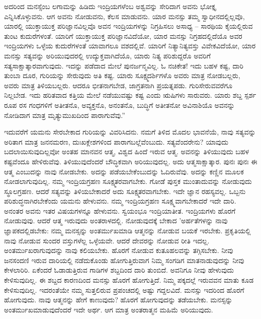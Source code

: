 ಅದರಿಂದ ಮನಸ್ಸೆಂಬ ಲಗಾಮನ್ನು ಹಿಡಿದು ಇಂದ್ರಿಯಗಳೆಂಬ ಅಶ್ವವನ್ನು ಸೇರಿದಾಗ ಅವನು ಭೋಕ್ತೃ ಎನ್ನಿಸಿಕೊಳ್ಳುವನು. ಆಗ ಅವನು ನೋಡುವನು, ಕೆಲಸ ಮಾಡುವನು. ಯಾರ ಮನಸ್ಸು ತಮ್ಮ ಸ್ವಾಧೀನದಲ್ಲಿಲ್ಲವೊ, ಯಾರಲ್ಲಿ ಯುಕ್ತಾಯುಕ್ತ ಪರಿಜ್ಞಾನವಿಲ್ಲವೊ ಅವನ ಇಂದ್ರಿಯಗಳನ್ನು ನಿಗ್ರಹಿಸಲು ಅಸಾಧ್ಯ – ಸಾರಥಿಯ ಕೈಯಲ್ಲಿರುವ ತುಂಟ ಕುದುರೆಗಳಂತೆ. ಯಾರಿಗೆ ಯುಕ್ತಾಯುಕ್ತ ಪರಿಜ್ಞಾನವಿದೆಯೋ, ಯಾರ ಮನಸ್ಸು ನಿಗ್ರಹದಲ್ಲಿದೆಯೊ ಅವರ ಇಂದ್ರಿಯಗಳು ಒಳ್ಳೆಯ ಕುದುರೆಗಳಂತೆ ಯಾವಾಗಲೂ ವಶದಲ್ಲಿವೆ. ಯಾರಿಗೆ ನಿತ್ಯಾನಿತ್ಯವಸ್ತು ವಿವೇಕವಿದೆಯೋ, ಯಾರ ಮನಸ್ಸು ಸತ್ಯವನ್ನು ಅರಿಯುವುದರಲ್ಲಿ ಉದ್ಯುಕ್ತವಾಗಿದೆಯೊ, ಯಾರು ನಿತ್ಯ ಪರಿಶುದ್ದರೊ ಅವರಿಗೆ ಸತ್ಯಸಾಕ್ಷಾತ್ಕಾರವಾಗುವುದು. ಇದನ್ನು ಪಡೆದಾದ ಮೇಲೆ ಪುನರ್ಜನ್ಮವಿಲ್ಲ. ಓ ನಚಿಕೇತ! ಇದು ಬಹಳ ಕಷ್ಟ, ದಾರಿ ತುಂಬಾ ದೂರ, ಗುರಿಯನ್ನು ಸೇರುವುದು ಅತಿ ಕಷ್ಟ. ಯಾರು ಸೂಕ್ಷ್ಮದರ್ಶಿಗಳೊ ಅವರು ಮಾತ್ರ ನೋಡಬಲ್ಲರು, ಅವರು ಮಾತ್ರ ತಿಳಿಯಬಲ್ಲರು. ಆದರೂ ಭೀತನಾಗಬೇಡ, ಜಾಗ್ರತನಾಗಿ ಪ್ರಯತ್ನಪಡು. ಗುರಿಸೇರುವವರೆಗೂ ನಿಲ್ಲಬೇಡ. ಇದು ಹರಿತವಾದ ಕತ್ತಿಯ ಮೇಲೆ ನಡೆಯುವಷ್ಟು ಕಷ್ಟ ಎಂದು ಋಷಿಗಳು ಸಾರುವರು. ಯಾರು ಶಬ್ದ ಸ್ಪರ್ಶ ರೂಪ ರಸ ಗಂಧಗಳಿಗೆ ಅತೀತನೊ, ಅವ್ಯಕ್ತನೊ, ಅನಂತನೊ, ಬುದ್ಧಿಗೆ ಅತೀತನೋ ಅವಿನಾಶಿಯೊ ಅವನನ್ನು ನೋಡಿದಾಗ ಮಾತ್ರ ಮೃತ್ಯುಮುಖದಿಂದ ಪಾರಾಗುವೆವು.”

ಇದುವರೆಗೆ ಯಮನು ಸೇರಬೇಕಾದ ಗುರಿಯನ್ನು ವಿವರಿಸಿದನು. ನಮಗೆ ತಿಳಿದ ಮೊದಲ ಭಾವನೆಯೆ, ನಾವು ಸತ್ಯವನ್ನು ಅರಿತಾಗ ಮಾತ್ರ ಜನನಮರಣ, ದುಃಖಕ್ಲೇಶಗಳಿಂದ ಪಾರಾಗಬಲ್ಲೆವೆಂಬುದು. ಸತ್ಯವೆಂದರೇನು? ಯಾವುದು ಬದಲಾಯಿಸುವುದಿಲ್ಲವೋ ಅಂತಹ ಮಾನವನ ಆತ್ಮ, ವಿಶ್ವದ ಹಿಂದೆ ಇರುವ ಆತ್ಮ. ಅವನನ್ನು ತಿಳಿಯುವುದು ಬಹಳ ಕಷ್ಟವೆಂದೂ ಹೇಳಿರುವೆವು. ತಿಳಿಯುವುದೆಂದರೆ ಬೌದ್ಧಿಕವಾಗಿ ಅರಿಯುವುದಲ್ಲ. ಅದು ಆತ್ಮಸಾಕ್ಷಾತ್ಕಾರ. ಪುನಃ ಪುನಃ ಈ ಆತ್ಮ ಎಂಬುದನ್ನು ನಾವು ನೋಡಬೇಕು. ಅದನ್ನು ಪಡೆಯಬೇಕೆಂಬುದನ್ನು ಓದಿರುವೆವು. ಅದನ್ನು ಕಣ್ಣಿನ ಮೂಲಕ ನೋಡಲಾಗುವುದಿಲ್ಲ. ನಮ್ಮ ಇಂದ್ರಿಯಗ್ರಹಣ ಸೂಕ್ಷ್ಮತರವಾಗಬೇಕು. ಗೋಡೆ ಪುಸ್ತಕ ಮುಂತಾದುವನ್ನು ನೋಡುವುದು ಸ್ಥೂಲಗ್ರಹಣ. ಆದರೆ ಸತ್ಯವನ್ನು ತಿಳಿಯಬೇಕಾದರೆ ಅದು ಸೂಕ್ಷ್ಮತರವಾಗಬೇಕು. ಇದೇ ಜ್ಞಾನ ರಹಸ್ಯವಲ್ಲ. ಒಬ್ಬನು ಪರಿಶುದ್ಧನಾಗಿರಬೇಕೆಂದು ಯಮನು ಹೇಳುವನು. ನಮ್ಮ ಇಂದ್ರಿಯಗ್ರಹಣ ಸೂಕ್ಷ್ಮವಾಗಬೇಕಾದರೆ ಇದೇ ದಾರಿ. ಅನಂತರ ಅವನು ಇತರ ವಿಷಯಗಳನ್ನೂ ಹೇಳುವನು. ಸ್ವಯಂಭೂ ಇಂದ್ರಿಯಾತೀತ. ಇಂದ್ರಿಯಗಳು ಹೊರಗೆ ನೋಡುವುವು. ಆದರೆ ಆತ್ಮ ಇರುವುದು ಅಂತರಾಳದಲ್ಲಿ. ನೋಡುವುದಕ್ಕೆ ಬೇಕಾದ 'ಅರ್ಹತೆಗಳನ್ನು ನಾವು ಜ್ಞಾಪಕದಲ್ಲಿಡಬೇಕು: ನಮ್ಮ ಮನಸ್ಸನ್ನು ಅಂತರ್ಮುಖಮಾಡಿ ಆತ್ಮನನ್ನು ನೋಡುವ ಬಯಕೆ ಇರಬೇಕು. ಪ್ರಕೃತಿಯಲ್ಲಿ ನಾವು ನೋಡುವ ಸುಂದರ ವಸ್ತುಗಳೆಲ್ಲ ಒಳ್ಳೆಯವೇ. ಆದರೆ ದೇವರನ್ನು ನೋಡುವ ರೀತಿ ಇದಲ್ಲ. ಅಂತರ್ಮುಖರಾಗುವುದನ್ನು ನಾವು ಕಲಿಯಬೇಕು. ಹೊರಗೆ ನೋಡುವ ಕುತೂಹಲವನ್ನು ತಗ್ಗಿಸಬೇಕು. ನೀವು ಜನಸಂದಣಿ ಇರುವ ದಾರಿಯಲ್ಲಿ ನಡೆದುಕೊಂಡು ಹೋಗುತ್ತಿರುವಾಗ ನಿಮ್ಮ ಸಂಗಡಿಗ ಮಾತನಾಡುವುದನ್ನು ನೀವು ಕೇಳಲಾರಿರಿ. ಏಕೆಂದರೆ ಓಡಾಡುತ್ತಿರುವ ಗಾಡಿಗಳ ಶಬ್ದದಿಂದ ದಾರಿ ತುಂಬಿದೆ. ಅವನಿಗೂ ನೀವು ಹೇಳುವುದು ಕೇಳಿಸುವುದಿಲ್ಲ. ಈ ಶಬ್ದದ ಕಾರಣದಿಂದ ಮನಸ್ಸು ಹೊರಗೆ ಹೋಗುತ್ತಿದೆ. ನಿಮ್ಮ ಪಕ್ಕದಲ್ಲೆ ಇರುವವನ ಮಾತು ಕೂಡ ಕೇಳಿಸುವುದಿಲ್ಲ. ಇದರಂತೆಯೇ ನಮ್ಮ ಸುತ್ತಲಿರುವ ಪ್ರಪಂಚದಲ್ಲಿ ಅಷ್ಟು ಗದ್ದಲವಿದೆ. ಮನಸ್ಸು ಇದರಿಂದ ಹೊರಗೆ ಹೋಗುವುದು. ನಾವು ಆತ್ಮನನ್ನು ಹೇಗೆ ಕಾಣುವುದು? ಹೊರಗೆ ಹೋಗುವುದನ್ನು ತಡೆಯಬೇಕು. ಮನಸ್ಸನ್ನು ಅಂತರ್ಮುಖಮಾಡುವುದೆಂದರೆ ಇದೇ ಅರ್ಥ. ಆಗ ಮಾತ್ರ ಅಂತರಾತ್ಮನ ಮಹಿಮೆ ಅರಿಯುವುದು.

